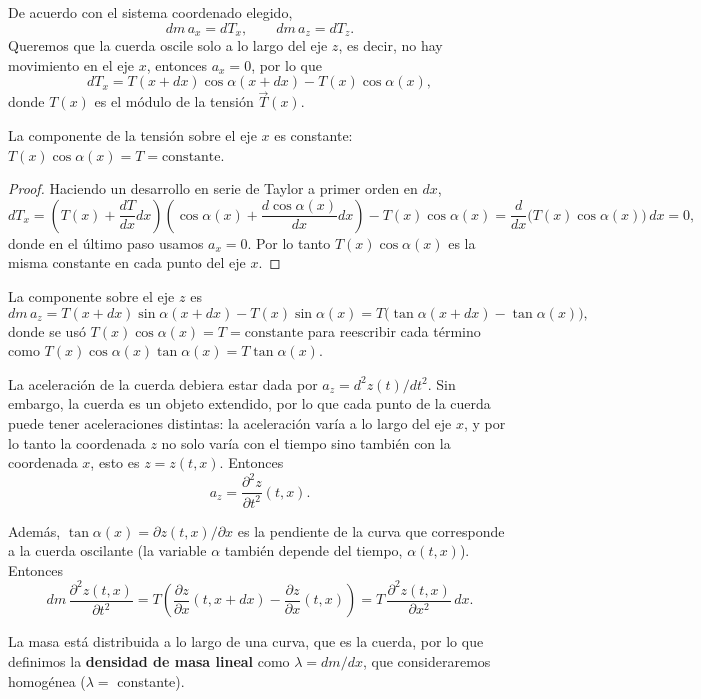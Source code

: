 De acuerdo con el sistema coordenado elegido,
\[
dm\, a_x = dT_x, \qquad dm\, a_z = dT_z .
\]
Queremos que la cuerda oscile solo a lo largo del eje $z$, es decir, no
hay movimiento en el eje $x$, entonces $a_x=0$, por lo que
\[
dT_x = T(x+dx)\cos\alpha(x+dx) - T(x)\cos\alpha(x),
\]
donde $T(x)$ es el módulo de la tensión $\vec T(x)$.

\begin{proposicionc}
La componente de la tensión sobre el eje $x$ es constante:
$T(x)\cos\alpha(x) = T = \text{constante}$.
\end{proposicionc}

\begin{proof}
Haciendo un desarrollo en serie de Taylor a primer orden en $dx$,
\[
dT_x = \left(T(x)+\frac{dT}{dx}dx\right)\left(\cos\alpha(x)+
\frac{d\cos\alpha(x)}{dx}dx\right) - T(x)\cos\alpha(x) =
\frac{d}{dx}\big(T(x)\cos\alpha(x)\big)\, dx = 0,
\]
donde en el último paso usamos $a_x=0$. Por lo tanto $T(x)\cos\alpha(x)$
es la misma constante en cada punto del eje $x$. \qedhere
\end{proof}

La componente sobre el eje $z$ es
\[
dm\,a_z = T(x+dx)\sin\alpha(x+dx) - T(x)\sin\alpha(x) = T\big(\tan
\alpha(x+dx)-\tan\alpha(x)\big),
\]
donde se usó $T(x)\cos\alpha(x)=T=\text{constante}$ para reescribir cada
término como $T(x)\cos\alpha(x)\tan\alpha(x)=T\tan\alpha(x)$.

La aceleración de la cuerda debiera estar dada por $a_z=d^2z(t)/dt^2$.
Sin embargo, la cuerda es un objeto extendido, por lo que cada punto de
la cuerda puede tener aceleraciones distintas: la aceleración varía a lo
largo del eje $x$, y por lo tanto la coordenada $z$ no solo varía con el
tiempo sino también con la coordenada $x$, esto es $z=z(t,x)$. Entonces
\[
a_z = \frac{\partial^2 z}{\partial t^2}(t,x).
\]

Además, $\tan\alpha(x) = \partial z(t,x)/\partial x$ es la pendiente de
la curva que corresponde a la cuerda oscilante (la variable $\alpha$
también depende del tiempo, $\alpha(t,x)$). Entonces
\[
dm\, \frac{\partial^2 z(t,x)}{\partial t^2} = T\left(\frac{\partial
z}{\partial x}(t,x+dx) - \frac{\partial z}{\partial x}(t,x)\right) =
T\,\frac{\partial^2 z(t,x)}{\partial x^2}\, dx .
\]

\begin{definicion}
La masa está distribuida a lo largo de una curva, que es la cuerda, por
lo que definimos la \textbf{densidad de masa lineal} como
$\lambda = dm/dx$, que consideraremos homogénea ($\lambda=$ constante).
\end{definicion}

